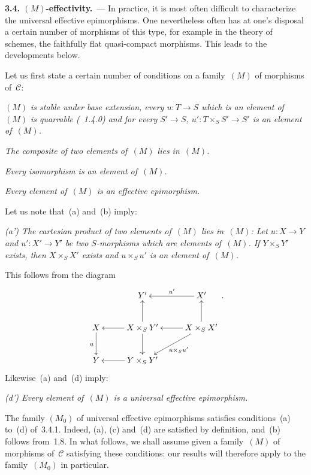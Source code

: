 \par{}
\noindent\textbf{3.4. \((M)\)-effectivity.}\ ---
\label{IV.sec.3.4}
In practice, it is most often difficult to characterize the universal
effective epimorphisms. One nevertheless often has at one's disposal a
certain number of morphisms of this type, for example in the theory of
schemes, the faithfully flat quasi-compact morphisms. This leads to the
developments below.

\label{IV.3.4.1}
Let us first state a certain number of conditions on a family~\((M)\) of
morphisms of~\(\mathcal{C}\):
\begin{enumeratea}
\item \emph{\((M)\) is stable under base extension, \ie every
\(u\colon T\to S\) which is an element of~\((M)\) is quarrable
(\cf~1.4.0) and for every \(S'\to S\),
\(u'\colon T\times_{S}S'\to S'\) is an element of~\((M)\).}
\item \emph{The composite of two elements of~\((M)\) lies in~\((M)\).}
\item \emph{Every isomorphism is an element of~\((M)\).}
\item \emph{Every element of~\((M)\) is an effective epimorphism.}
\end{enumeratea}

Let us note that~(a) and~(b) imply:

\emph{(a') The cartesian product of two elements of~\((M)\) lies
in~\((M)\): Let \(u\colon X\to Y\) and \(u'\colon X'\to Y'\) be two
\(S\)-morphisms which are elements of~\((M)\). If \(Y\times_{S}Y'\) exists,
then \(X\times_{S}X'\) exists and \(u\times_{S}u'\) is an element
of~\((M)\).}

This follows from the diagram
\[
\xymatrix@C=2.6em@R=2.4em{
  & Y'
  & X' \ar[l]_{u'}
\\
X \ar[d]_{u}
  & X\times_{S}Y' \ar[l] \ar[u] \ar[d]
  & X\times_{S}X' \ar[l] \ar[u] \ar[dl]^{u\times_{S}u'}
\\
Y
  & Y\times_{S}Y' \ar[l]
  &
}
\,.
\]
Likewise~(a) and~(d) imply:

\emph{(d') Every element of~\((M)\) is a universal effective epimorphism.}

\label{IV.3.4.2}
The family \((M_{0})\) of universal effective epimorphisms satisfies
conditions~(a) to~(d) of~3.4.1. Indeed, (a), (c) and~(d) are satisfied by
definition, and~(b) follows from~1.8. In what follows, we shall assume given
a family~\((M)\) of morphisms of~\(\mathcal{C}\) satisfying these conditions:
our results will therefore apply to the family~\((M_{0})\) in particular.

